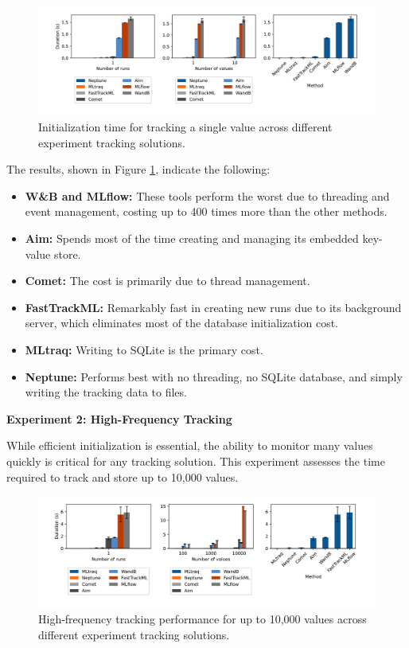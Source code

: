 \begin{figure}[h!]
    \centering
    \includegraphics[width=\textwidth]{images/mltraq/mltraq-Initialization-time.png}
    \caption{Initialization time for tracking a single value across different experiment tracking solutions.}
    \label{fig:init-time}
\end{figure}

The results, shown in Figure \ref{fig:init-time}, indicate the following:

\begin{itemize}
    \item \textbf{W\&B and MLflow:} These tools perform the worst due to threading and event management, costing up to 400 times more than the other methods.
    \item \textbf{Aim:} Spends most of the time creating and managing its embedded key-value store.
    \item \textbf{Comet:} The cost is primarily due to thread management.
    \item \textbf{FastTrackML:} Remarkably fast in creating new runs due to its background server, which eliminates most of the database initialization cost.
    \item \textbf{MLtraq:} Writing to SQLite is the primary cost.
    \item \textbf{Neptune:} Performs best with no threading, no SQLite database, and simply writing the tracking data to files.\newline
\end{itemize}

\textbf{Experiment 2: High-Frequency Tracking}

While efficient initialization is essential, the ability to monitor many values quickly is critical for any tracking solution. This experiment assesses the time required to track and store up to 10,000 values.

\begin{figure}[h!]
    \centering
    \includegraphics[width=\textwidth]{images/mltraq/mltraq-high-frequency.png}
    \caption{High-frequency tracking performance for up to 10,000 values across different experiment tracking solutions.}
    \label{fig:high-freq}
\end{figure}

